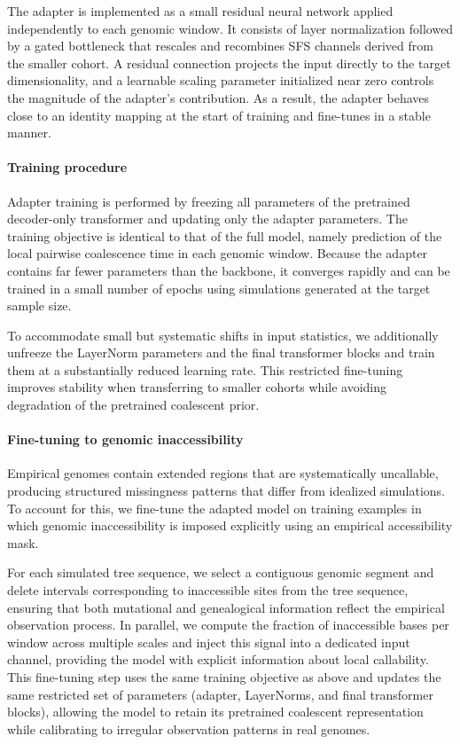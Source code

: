 \documentclass[9pt,twocolumn,twoside]{pnas-new} %
\begin{document}
{The adapter is implemented as a small residual neural network applied independently
to each genomic window.
It consists of layer normalization followed by a gated bottleneck that rescales and
recombines SFS channels derived from the smaller cohort.
A residual connection projects the input directly to the target dimensionality, and
a learnable scaling parameter initialized near zero controls the magnitude of the
adapter's contribution.
As a result, the adapter behaves close to an identity mapping at the start of
training and fine-tunes in a stable manner.

\paragraph{Training procedure}
Adapter training is performed by freezing all parameters of the pretrained
decoder-only transformer and updating only the adapter parameters.
The training objective is identical to that of the full model, namely prediction of
the local pairwise coalescence time in each genomic window.
Because the adapter contains far fewer parameters than the backbone, it converges
rapidly and can be trained in a small number of epochs using simulations generated
at the target sample size.

To accommodate small but systematic shifts in input statistics, we additionally
unfreeze the LayerNorm parameters and the final transformer blocks and train them at
a substantially reduced learning rate.
This restricted fine-tuning improves stability when transferring to smaller cohorts
while avoiding degradation of the pretrained coalescent prior.

\paragraph{Fine-tuning to genomic inaccessibility}
Empirical genomes contain extended regions that are systematically uncallable,
producing structured missingness patterns that differ from idealized simulations.
To account for this, we fine-tune the adapted model on training examples in which
genomic inaccessibility is imposed explicitly using an empirical accessibility mask.

For each simulated tree sequence, we select a contiguous genomic segment and delete
intervals corresponding to inaccessible sites from the tree sequence, ensuring that
both mutational and genealogical information reflect the empirical observation
process.
In parallel, we compute the fraction of inaccessible bases per window across multiple
scales and inject this signal into a dedicated input channel, providing the model
with explicit information about local callability.
This fine-tuning step uses the same training objective as above and updates the same
restricted set of parameters (adapter, LayerNorms, and final transformer blocks),
allowing the model to retain its pretrained coalescent representation while
calibrating to irregular observation patterns in real genomes.


}
\end{document}
